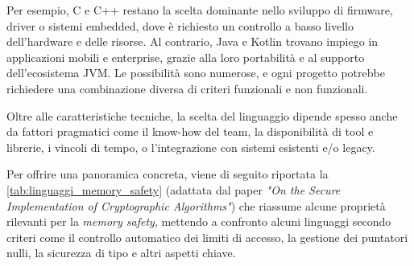 Per esempio, C e C++ restano la scelta dominante nello sviluppo di firmware, driver
o sistemi embedded, dove è richiesto un controllo a basso livello dell'hardware
e delle risorse. Al contrario, Java e Kotlin trovano impiego in applicazioni
mobili e enterprise, grazie alla loro portabilità e al supporto dell'ecosistema JVM.
Le possibilità sono numerose, e ogni progetto potrebbe richiedere una combinazione
diversa di criteri funzionali e non funzionali.

Oltre alle caratteristiche tecniche, la scelta del linguaggio dipende spesso
anche da fattori pragmatici come il know-how del team, la disponibilità di tool e
librerie, i vincoli di tempo, o l'integrazione con sistemi esistenti e/o legacy.

Per offrire una panoramica concreta, viene di seguito riportata la
\autoref{tab:linguaggi_memory_safety} (adattata dal paper \textit{"On the Secure
Implementation of Cryptographic Algorithms"}\cite{fbk_crypto_algo}) che riassume
alcune proprietà rilevanti per la \textit{memory safety}, mettendo a confronto
alcuni linguaggi secondo criteri come il controllo automatico dei limiti di
accesso, la gestione dei puntatori nulli, la sicurezza di tipo e altri aspetti
chiave.

